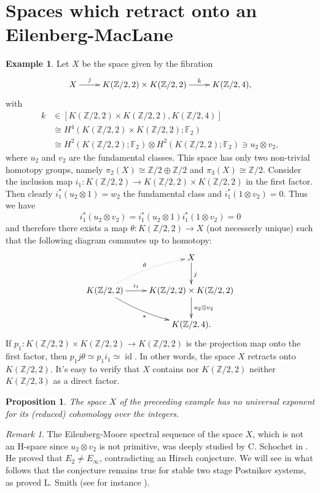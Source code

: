 \documentclass[11pt,a4paper]{amsart}
\theoremstyle{plain}
\newtheorem{prop}[thm]{Proposition}
\theoremstyle{definition}
\newtheorem{exmp}{Example}[section]
\theoremstyle{remark}
\newtheorem*{rem}{Remark}
\DeclareMathOperator{\id}{id}
\newcommand{\Z}{\mathbb{Z}}
\newcommand{\F}{\mathbb{F}}
\begin{document}
\section{Spaces which retract onto an Eilenberg-MacLane}
\label{s:retract}

\begin{exmp}
Let $X$ be the space given by the fibration
$$\xymatrix{
X\ar[r]^-j &K(\Z/2,2)\times K(\Z/2,2)\ar[r]^-{k} &K(\Z/2,4),
}$$ with 
\begin{align*}
k &\in [K(\Z/2,2)\times K(\Z/2,2),K(\Z/2,4)]\\
&\cong H^4(K(\Z/2,2)\times K(\Z/2,2);\F_2)\\
&\cong H^2(K(\Z/2,2);\F_2)\otimes H^2(K(\Z/2,2);\F_2) \ni u_2\otimes v_2,
\end{align*} where $u_2$ and $v_2$ are the fundamental classes. This space has only two non-trivial homotopy groups, namely $\pi_2(X)\cong\Z/2\oplus\Z/2$ and $\pi_3(X)\cong\Z/2$.
Consider the inclusion map $i_1:K(\Z/2,2)\to K(\Z/2,2)\times K(\Z/2,2)$ in the first factor. Then clearly $i_1^*(u_2\otimes1)=w_2$ the fundamental class and $i_1^*(1\otimes v_2)=0$. Thus we have
$$
i_1^*(u_2\otimes v_2)=i_1^*(u_2\otimes1)i_1^*(1\otimes v_2)=0
$$ and therefore there exists a map $\theta:K(\Z/2,2)\to X$ (not necesserly unique) such that the following diagram commutes up to homotopy:
$$\xymatrix{
&X\ar[d]^j\\
K(\Z/2,2)\ar[r]^-{i_1}\ar@/^/@{.>}[ru]^\theta\ar@/_/[rd]_{*} &K(\Z/2,2)\times K(\Z/2,2)\ar[d]^{u_2\otimes v_2}\\
&K(\Z/2,4).
}$$ If $p_1:K(\Z/2,2)\times K(\Z/2,2)\to K(\Z/2,2)$ is the projection map onto the first factor, then $p_1j\theta\simeq p_1i_1\simeq\id$. In other words, the space $X$ retracts onto $K(\Z/2,2)$. It's easy to verify that $X$ contains nor $K(\Z/2,2)$ neither $K(\Z/2,3)$ as a direct factor.
\end{exmp}

\begin{prop}
The space $X$ of the preceeding example has no universal exponent for its (reduced) cohomology over the integers.
\end{prop}

\begin{rem}
The Eilenberg-Moore spectral sequence of the space $X$, which is not an H-space since $u_2\otimes v_2$ is not primitive, was deeply studied by C. Schochet in \cite{Sc-71}. He proved that $E_2\not=E_\infty$, contradicting an Hirsch conjecture. We will see in what follows that the conjecture remains true for stable two stage Postnikov systems, as proved L. Smith (see for instance \cite[Theorem 5.2, p. 92]{Sm-70}).
\end{rem}
\end{document}
